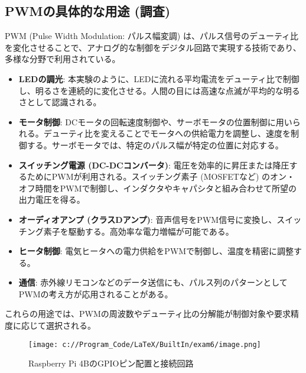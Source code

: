 \documentclass[a4paper,11pt,dvipdfmx]{jsarticle}
\begin{document}
\subsection{PWMの具体的な用途 (調査)}
PWM (Pulse Width Modulation: パルス幅変調) は、パルス信号のデューティ比を変化させることで、アナログ的な制御をデジタル回路で実現する技術であり、多様な分野で利用されている。
\begin{itemize}
    \item \textbf{LEDの調光}: 本実験のように、LEDに流れる平均電流をデューティ比で制御し、明るさを連続的に変化させる。人間の目には高速な点滅が平均的な明るさとして認識される。
    \item \textbf{モータ制御}: DCモータの回転速度制御や、サーボモータの位置制御に用いられる。デューティ比を変えることでモータへの供給電力を調整し、速度を制御する。サーボモータでは、特定のパルス幅が特定の位置に対応する。
    \item \textbf{スイッチング電源 (DC-DCコンバータ)}: 電圧を効率的に昇圧または降圧するためにPWMが利用される。スイッチング素子 (MOSFETなど) のオン・オフ時間をPWMで制御し、インダクタやキャパシタと組み合わせて所望の出力電圧を得る。
    \item \textbf{オーディオアンプ (クラスDアンプ)}: 音声信号をPWM信号に変換し、スイッチング素子を駆動する。高効率な電力増幅が可能である。
    \item \textbf{ヒータ制御}: 電気ヒータへの電力供給をPWMで制御し、温度を精密に調整する。
    \item \textbf{通信}: 赤外線リモコンなどのデータ送信にも、パルス列のパターンとしてPWMの考え方が応用されることがある。
\end{itemize}
これらの用途では、PWMの周波数やデューティ比の分解能が制御対象や要求精度に応じて選択される。

\begin{figure}[h]
\centering
\texttt{[image: c://Program\_Code/LaTeX/BuiltIn/exam6/image.png]}
\caption{Raspberry Pi 4BのGPIOピン配置と接続回路}
\label{fig:raspberry_pi_circuit_2}
\end{figure}
\end{document}
